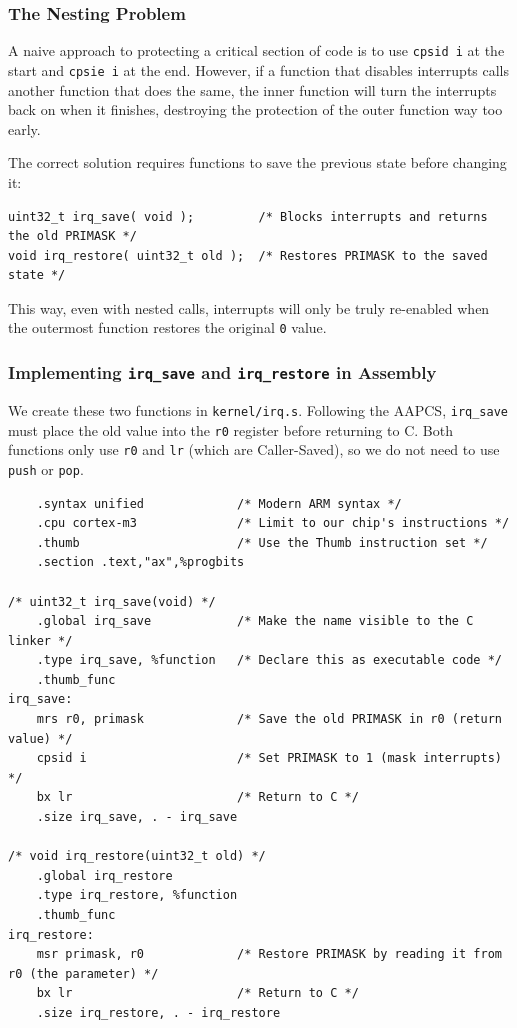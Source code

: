 \subsubsection{The Nesting Problem}
A naive approach to protecting a critical section of code is to use \texttt{cpsid i} at the start and \texttt{cpsie i} at the end. However, if a function that disables interrupts calls another function that does the same, the inner function will turn the interrupts back on when it finishes, destroying the protection of the outer function way too early.

The correct solution requires functions to save the previous state before changing it:
\begin{lstlisting}
uint32_t irq_save( void );         /* Blocks interrupts and returns the old PRIMASK */
void irq_restore( uint32_t old );  /* Restores PRIMASK to the saved state */
\end{lstlisting}
This way, even with nested calls, interrupts will only be truly re-enabled when the outermost function restores the original \texttt{0} value.

\subsubsection{Implementing \texttt{irq\_save} and \texttt{irq\_restore} in Assembly}
We create these two functions in \texttt{kernel/irq.s}. Following the AAPCS, \texttt{irq\_save} must place the old value into the \texttt{r0} register before returning to C. Both functions only use \texttt{r0} and \texttt{lr} (which are Caller-Saved), so we do not need to use \texttt{push} or \texttt{pop}.

\begin{lstlisting}
    .syntax unified             /* Modern ARM syntax */
    .cpu cortex-m3              /* Limit to our chip's instructions */
    .thumb                      /* Use the Thumb instruction set */
    .section .text,"ax",%progbits

/* uint32_t irq_save(void) */
    .global irq_save            /* Make the name visible to the C linker */
    .type irq_save, %function   /* Declare this as executable code */
    .thumb_func                 
irq_save:
    mrs r0, primask             /* Save the old PRIMASK in r0 (return value) */
    cpsid i                     /* Set PRIMASK to 1 (mask interrupts) */
    bx lr                       /* Return to C */
    .size irq_save, . - irq_save

/* void irq_restore(uint32_t old) */
    .global irq_restore         
    .type irq_restore, %function 
    .thumb_func                 
irq_restore:
    msr primask, r0             /* Restore PRIMASK by reading it from r0 (the parameter) */
    bx lr                       /* Return to C */
    .size irq_restore, . - irq_restore
\end{lstlisting}

